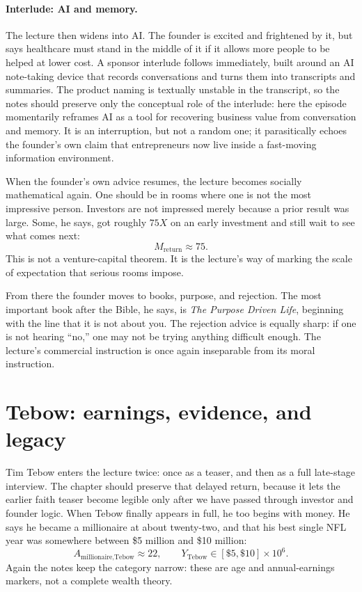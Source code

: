\paragraph{Interlude: AI and memory.}
The lecture then widens into AI. The founder is excited and frightened by it, but says healthcare must stand in the middle of it if it allows more people to be helped at lower cost. A sponsor interlude follows immediately, built around an AI note-taking device that records conversations and turns them into transcripts and summaries. The product naming is textually unstable in the transcript, so the notes should preserve only the conceptual role of the interlude: here the episode momentarily reframes AI as a tool for recovering business value from conversation and memory. It is an interruption, but not a random one; it parasitically echoes the founder's own claim that entrepreneurs now live inside a fast-moving information environment.

When the founder's own advice resumes, the lecture becomes socially mathematical again. One should be in rooms where one is not the most impressive person. Investors are not impressed merely because a prior result was large. Some, he says, got roughly \(75X\) on an early investment and still wait to see what comes next:
\begin{equation}
M_{\text{return}} \approx 75.
\end{equation}
This is not a venture-capital theorem. It is the lecture's way of marking the scale of expectation that serious rooms impose.

From there the founder moves to books, purpose, and rejection. The most important book after the Bible, he says, is \emph{The Purpose Driven Life}, beginning with the line that it is not about you. The rejection advice is equally sharp: if one is not hearing ``no,'' one may not be trying anything difficult enough. The lecture's commercial instruction is once again inseparable from its moral instruction.

\section{Tebow: earnings, evidence, and legacy}

Tim Tebow enters the lecture twice: once as a teaser, and then as a full late-stage interview. The chapter should preserve that delayed return, because it lets the earlier faith teaser become legible only after we have passed through investor and founder logic. When Tebow finally appears in full, he too begins with money. He says he became a millionaire at about twenty-two, and that his best single NFL year was somewhere between \$5 million and \$10 million:
\begin{equation}
A_{\text{millionaire,Tebow}} \approx 22, \qquad
Y_{\text{Tebow}} \in [\$5,\$10]\times 10^6.
\end{equation}
Again the notes keep the category narrow: these are age and annual-earnings markers, not a complete wealth theory.

